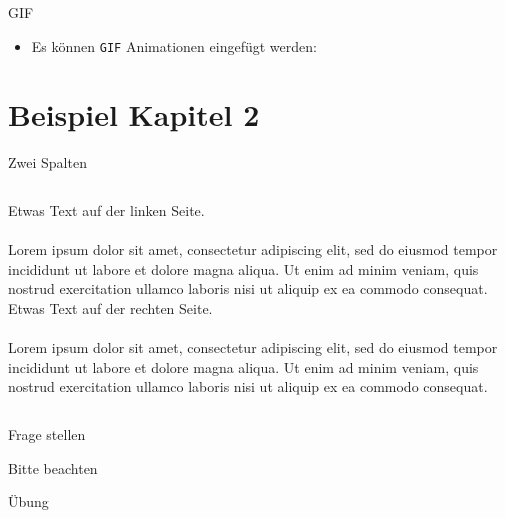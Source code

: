 \documentclass[aspectratio=169]{beamer}
\begin{document}
\begin{frame}{GIF}
    \begin{itemize}
        \item Es können \lstinline|GIF| Animationen eingefügt werden:
    \end{itemize}

    \begin{figure}
        \caption{\cite{wikipedia2023laufzeitmessung}}
    \end{figure}
\end{frame}

\section{Beispiel Kapitel 2}

\begin{frame}{Zwei Spalten}
    \begin{columns}
            Etwas Text auf der linken Seite.\\~\\

            Lorem ipsum dolor sit amet, consectetur adipiscing elit, sed do eiusmod tempor incididunt ut labore et dolore magna aliqua. Ut enim ad minim veniam, quis nostrud exercitation ullamco laboris nisi ut aliquip ex ea commodo consequat.\cite{lipsum2022lorem}
            Etwas Text auf der rechten Seite.\\~\\

            Lorem ipsum dolor sit amet, consectetur adipiscing elit, sed do eiusmod tempor incididunt ut labore et dolore magna aliqua. Ut enim ad minim veniam, quis nostrud exercitation ullamco laboris nisi ut aliquip ex ea commodo consequat.\cite{lipsum2022lorem}
    \end{columns}
\end{frame}

\begin{frame}{Frage stellen}
\end{frame}

\begin{frame}{Bitte beachten}
\end{frame}

\begin{frame}{Übung}
\end{frame}
\end{document}
